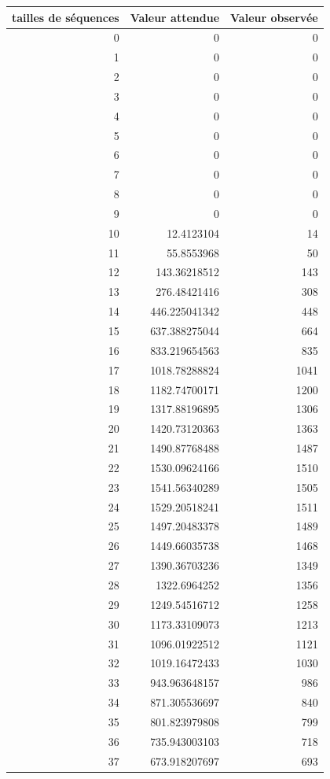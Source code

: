 \documentclass[10pt,a4paper]{article}
\begin{document}
\begin{figure}[h]
\centering
\begin{tabular}{|r|r|r|}
\hline
tailles de séquences & Valeur attendue & Valeur observée\\
\hline
0 & 0 & 0\\
1 & 0 & 0\\
2 & 0 & 0\\
3 & 0 & 0\\
4 & 0 & 0\\
5 & 0 & 0\\
6 & 0 & 0\\
7 & 0 & 0\\
8 & 0 & 0\\
9 & 0 & 0\\
10 & 12.4123104 & 14\\
11 & 55.8553968 & 50\\
12 & 143.36218512 & 143\\
13 & 276.48421416 & 308\\
14 & 446.225041342 & 448\\
15 & 637.388275044 & 664\\
16 & 833.219654563 & 835\\
17 & 1018.78288824 & 1041\\
18 & 1182.74700171 & 1200\\
19 & 1317.88196895 & 1306\\
20 & 1420.73120363 & 1363\\
21 & 1490.87768488 & 1487\\
22 & 1530.09624166 & 1510\\
23 & 1541.56340289 & 1505\\
24 & 1529.20518241 & 1511\\
25 & 1497.20483378 & 1489\\
26 & 1449.66035738 & 1468\\
27 & 1390.36703236 & 1349\\
28 & 1322.6964252 & 1356\\
29 & 1249.54516712 & 1258\\
30 & 1173.33109073 & 1213\\
31 & 1096.01922512 & 1121\\
32 & 1019.16472433 & 1030\\
33 & 943.963648157 & 986\\
34 & 871.305536697 & 840\\
35 & 801.823979808 & 799\\
36 & 735.943003103 & 718\\
37 & 673.918207697 & 693\\

\end{tabular}
\end{figure}
\end{document}
